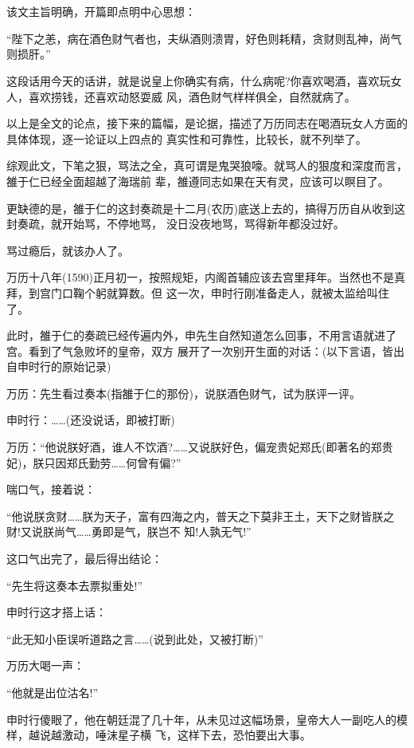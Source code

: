 \documentclass[11pt,a4paper,onecolumn]{article}
\begin{document}
\section[\thesection]{}

该文主旨明确，开篇即点明中心思想：

``陛下之恙，病在酒色财气者也，夫纵酒则溃胃，好色则耗精，贪财则乱神，尚气则损肝。''

这段话用今天的话讲，就是说皇上你确实有病，什么病呢?你喜欢喝酒，喜欢玩女人，喜欢捞钱，还喜欢动怒耍威
风，酒色财气样样俱全，自然就病了。

以上是全文的论点，接下来的篇幅，是论据，描述了万历同志在喝酒玩女人方面的具体体现，逐一论证以上四点的
真实性和可靠性，比较长，就不列举了。

综观此文，下笔之狠，骂法之全，真可谓是鬼哭狼嚎。就骂人的狠度和深度而言，雒于仁已经全面超越了海瑞前
辈，雒遵同志如果在天有灵，应该可以瞑目了。

更缺德的是，雒于仁的这封奏疏是十二月(农历)底送上去的，搞得万历自从收到这封奏疏，就开始骂，不停地骂，
没日没夜地骂，骂得新年都没过好。

骂过瘾后，就该办人了。

万历十八年(1590)正月初一，按照规矩，内阁首辅应该去宫里拜年。当然也不是真拜，到宫门口鞠个躬就算数。但
这一次，申时行刚准备走人，就被太监给叫住了。

此时，雒于仁的奏疏已经传遍内外，申先生自然知道怎么回事，不用言语就进了宫。看到了气急败坏的皇帝，双方
展开了一次别开生面的对话：(以下言语，皆出自申时行的原始记录)

万历：先生看过奏本(指雒于仁的那份)，说朕酒色财气，试为朕评一评。

申时行：……(还没说话，即被打断)

万历：``他说朕好酒，谁人不饮酒?……又说朕好色，偏宠贵妃郑氏(即著名的郑贵妃)，朕只因郑氏勤劳……何曾有偏?''

喘口气，接着说：

``他说朕贪财……朕为天子，富有四海之内，普天之下莫非王土，天下之财皆朕之财!又说朕尚气……勇即是气，朕岂不
知!人孰无气!''

这口气出完了，最后得出结论：

``先生将这奏本去票拟重处!''

申时行这才搭上话：

``此无知小臣误听道路之言……(说到此处，又被打断)''

万历大喝一声：

``他就是出位沽名!''

申时行傻眼了，他在朝廷混了几十年，从未见过这幅场景，皇帝大人一副吃人的模样，越说越激动，唾沫星子横
飞，这样下去，恐怕要出大事。
\end{document}
